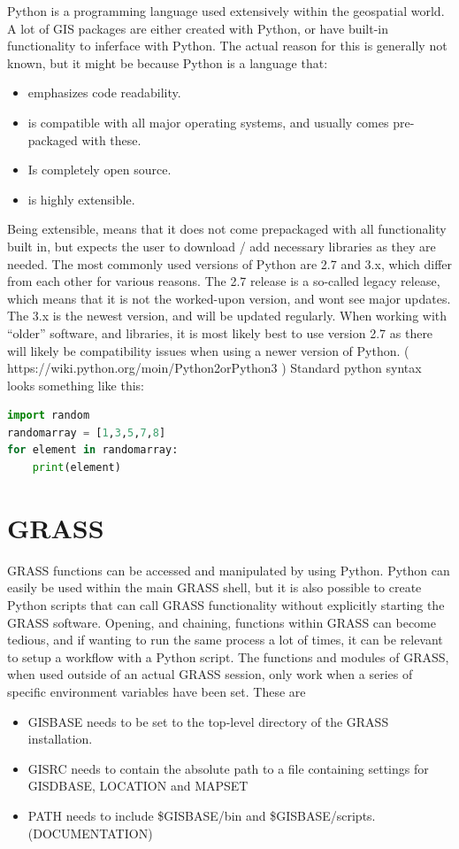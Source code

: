 Python is a programming language used extensively within the geospatial world. A lot of GIS packages are either created with Python, or have built-in functionality to inferface with Python. The actual reason for this is generally not known, but it might be because Python is a language that:
\begin{itemize}
\item emphasizes code readability.
\item is compatible with all major operating systems, and usually comes pre-packaged with these. 
\item Is completely open source. 
\item is highly extensible. 
\end{itemize}
Being extensible, means that it does not come prepackaged with all functionality built in, but expects the user to download / add necessary libraries as they are needed. 
The most commonly used versions of Python are 2.7 and 3.x, which differ from each other for various reasons. The 2.7 release is a so-called legacy release, which means that it is not the worked-upon version, and wont see major updates. The 3.x is the newest version, and will be updated regularly. When working with “older” software, and libraries, it is most likely best to use version 2.7 as there will likely be compatibility issues when using a newer version of Python. ( https://wiki.python.org/moin/Python2orPython3 )
Standard python syntax looks something like this:\\

\begin{lstlisting}[language=Python]
import random
randomarray = [1,3,5,7,8]
for element in randomarray:
	print(element)
\end{lstlisting}

\section{GRASS}

GRASS functions can be accessed and manipulated by using Python. Python can easily be used within the main GRASS shell, but it is also possible to create Python scripts that can call GRASS functionality without explicitly starting the GRASS software.
Opening, and chaining, functions within GRASS can become tedious, and if wanting to run the same process a lot of times, it can be relevant to setup a workflow with a Python script.
The functions and modules of GRASS, when used outside of an actual GRASS session, only work when a series of specific environment variables have been set. 
These are
\begin{itemize}
\item GISBASE needs to be set to the top-level directory of the GRASS installation. 
\item GISRC needs to contain the absolute path to a file containing settings for GISDBASE, LOCATION and MAPSET 
\item PATH needs to include \$GISBASE/bin and \$GISBASE/scripts. (DOCUMENTATION)
\end{itemize}

